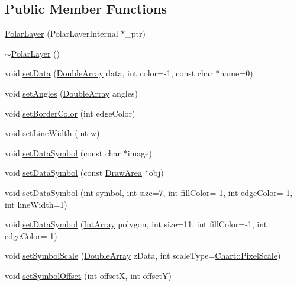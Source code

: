 \subsection*{Public Member Functions}
\begin{DoxyCompactItemize}
\item 
\hyperlink{class_polar_layer_a38e4c8a6a9b14259423d9b338b843b9a}{Polar\+Layer} (Polar\+Layer\+Internal $\ast$\+\_\+ptr)
\item 
\hyperlink{class_polar_layer_a31717156ea65ea5daa010c51322bec9c}{$\sim$\+Polar\+Layer} ()
\item 
void \hyperlink{class_polar_layer_a0a1aa3f4b5c9545790e46be367104dcc}{set\+Data} (\hyperlink{class_double_array}{Double\+Array} data, int color=-\/1, const char $\ast$name=0)
\item 
void \hyperlink{class_polar_layer_a3712e00d3aef0962d55ffc6e396ee0fe}{set\+Angles} (\hyperlink{class_double_array}{Double\+Array} angles)
\item 
void \hyperlink{class_polar_layer_a4cb8110e5d28368088a1798d6dbc7c6c}{set\+Border\+Color} (int edge\+Color)
\item 
void \hyperlink{class_polar_layer_abfffe32ae3290e562fa3642f8af14ca6}{set\+Line\+Width} (int w)
\item 
void \hyperlink{class_polar_layer_afea23161a7cef63c1dbdf7525dc33b1d}{set\+Data\+Symbol} (const char $\ast$image)
\item 
void \hyperlink{class_polar_layer_a8da7e1c4f14a9bc874fdeaa89e4b82cb}{set\+Data\+Symbol} (const \hyperlink{class_draw_area}{Draw\+Area} $\ast$obj)
\item 
void \hyperlink{class_polar_layer_a6c2df34e76a9ed25cfa42e1d37d782a3}{set\+Data\+Symbol} (int symbol, int size=7, int fill\+Color=-\/1, int edge\+Color=-\/1, int line\+Width=1)
\item 
void \hyperlink{class_polar_layer_aed7d56050c359edaaf332732355f80f1}{set\+Data\+Symbol} (\hyperlink{class_int_array}{Int\+Array} polygon, int size=11, int fill\+Color=-\/1, int edge\+Color=-\/1)
\item 
void \hyperlink{class_polar_layer_a5c1c2625aa1860690926f32b181fe72d}{set\+Symbol\+Scale} (\hyperlink{class_double_array}{Double\+Array} z\+Data, int scale\+Type=\hyperlink{namespace_chart_af8005281e1fb57d737e9f89b13605808afebebf69a28e58958dc5f9da3ece2147}{Chart\+::\+Pixel\+Scale})
\item 
void \hyperlink{class_polar_layer_aeb69fbf0f85cc7dfb54167adc8f205d3}{set\+Symbol\+Offset} (int offsetX, int offsetY)
\item 

\end{DoxyCompactItemize}
